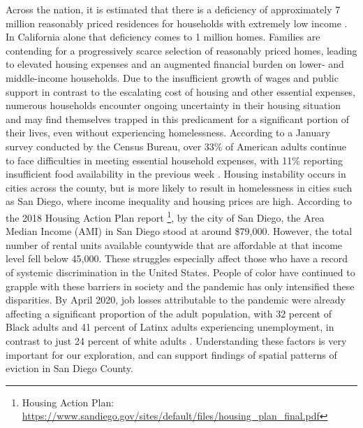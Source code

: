 \documentclass[man, 12pt, donotrepeattitle, floatsintext]{apa7} %
\begin{document}
Across the nation, it is estimated that there is a deficiency of approximately 7 million reasonably priced residences for households with extremely low income \parencite{Kuntz2019}. In California alone that deficiency comes to 1 million homes. Families are contending for a progressively scarce selection of reasonably priced homes, leading to elevated housing expenses and an augmented financial burden on lower- and middle-income households. Due to the insufficient growth of wages and public support in contrast to the escalating cost of housing and other essential expenses, numerous households encounter ongoing uncertainty in their housing situation and may find themselves trapped in this predicament for a significant portion of their lives, even without experiencing homelessness. According to a January survey conducted by the Census Bureau, over 33\% of American adults continue to face difficulties in meeting essential household expenses, with 11\% reporting insufficient food availability in the previous week \parencite{Vesoulis2021}. Housing instability occurs in cities across the county, but is more likely to result in homelessness in cities such as San Diego, where income inequality and housing prices are high. According to the 2018 Housing Action Plan report \footnote{Housing Action Plan: \url{https://www.sandiego.gov/sites/default/files/housing_plan_final.pdf}}, by the city of San Diego, the Area Median Income (AMI) in San Diego stood at around \$79,000. However, the total number of rental units available countywide that are affordable at that income level fell below 45,000. These struggles especially affect those who have a record of systemic discrimination in the United States. People of color have continued to grapple with these barriers in society and the pandemic has only intensified these disparities. By April 2020, job losses attributable to the pandemic were already affecting a significant proportion of the adult population, with 32 percent of Black adults and 41 percent of Latinx adults experiencing unemployment, in contrast to just 24 percent of white adults \parencite{Lake2022}.  Understanding these factors is very important for our exploration, and can support findings of spatial patterns of eviction in San Diego County. 
\end{document}
